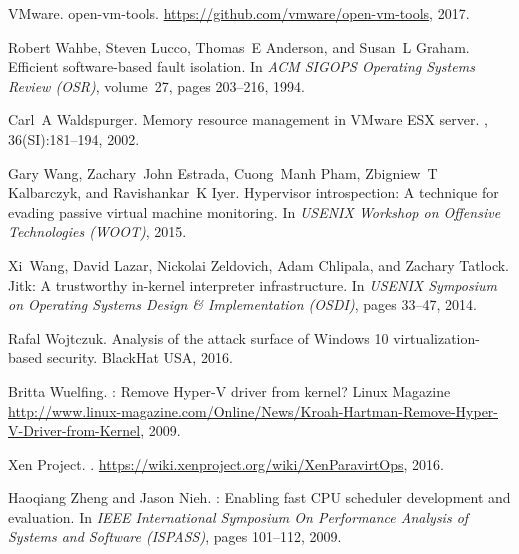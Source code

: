 \documentclass[11pt]{article}
\begin{document}
\begin{thebibliography}{10}
\begin{small}
  VMware.
  \newblock open-vm-tools.
  \newblock \url{https://github.com/vmware/open-vm-tools}, 2017.
  
  Robert Wahbe, Steven Lucco, Thomas~E Anderson, and Susan~L Graham.
  \newblock Efficient software-based fault isolation.
  \newblock In {\em ACM SIGOPS Operating Systems Review (OSR)}, volume~27, pages
    203--216, 1994.
  
  Carl~A Waldspurger.
  \newblock Memory resource management in {VMware ESX} server.
  , 36(SI):181--194,
    2002.
  
  Gary Wang, Zachary~John Estrada, Cuong~Manh Pham, Zbigniew~T Kalbarczyk, and
    Ravishankar~K Iyer.
  \newblock Hypervisor introspection: A technique for evading passive virtual
    machine monitoring.
  \newblock In {\em USENIX Workshop on Offensive Technologies (WOOT)}, 2015.
  
  Xi~Wang, David Lazar, Nickolai Zeldovich, Adam Chlipala, and Zachary Tatlock.
  \newblock Jitk: A trustworthy in-kernel interpreter infrastructure.
  \newblock In {\em USENIX Symposium on Operating Systems Design \&
    Implementation (OSDI)}, pages 33--47, 2014.
  
  Rafal Wojtczuk.
  \newblock Analysis of the attack surface of {Windows} 10 virtualization-based
    security.
  \newblock BlackHat USA, 2016.
  
  Britta Wuelfing.
  : Remove {Hyper-V} driver from kernel?
  \newblock Linux Magazine
    \url{http://www.linux-magazine.com/Online/News/Kroah-Hartman-Remove-Hyper-V-Driver-from-Kernel},
    2009.
  
  {Xen Project}.
  .
  \newblock \url{https://wiki.xenproject.org/wiki/XenParavirtOps}, 2016.
  
  Haoqiang Zheng and Jason Nieh.
  : Enabling fast {CPU} scheduler development and evaluation.
  \newblock In {\em IEEE International Symposium On Performance Analysis of
    Systems and Software (ISPASS)}, pages 101--112, 2009.
  \end{small}
  \end{thebibliography}
\end{document}
